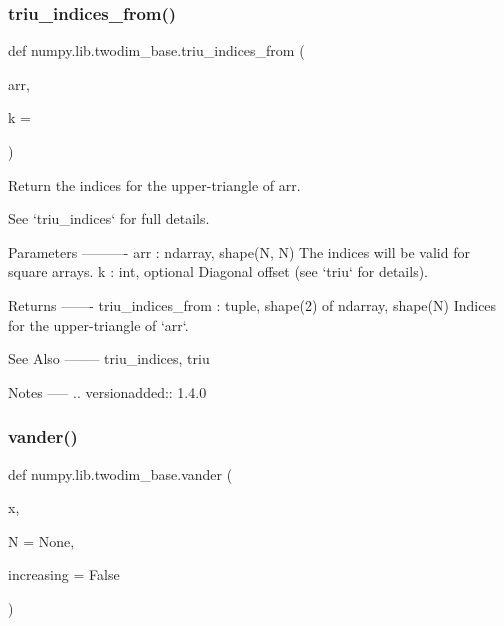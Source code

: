  \mbox{\label{namespacenumpy_1_1lib_1_1twodim__base_aaa286c33b12fe305ea9ead63f3f25f38}} 
\subsubsection{\texorpdfstring{triu\+\_\+indices\+\_\+from()}{triu\_indices\_from()}}
{\footnotesize\ttfamily def numpy.\+lib.\+twodim\+\_\+base.\+triu\+\_\+indices\+\_\+from (\begin{DoxyParamCaption}\item[{}]{arr,  }\item[{}]{k = {} }\end{DoxyParamCaption})}

\begin{DoxyVerb}Return the indices for the upper-triangle of arr.

See `triu_indices` for full details.

Parameters
----------
arr : ndarray, shape(N, N)
    The indices will be valid for square arrays.
k : int, optional
    Diagonal offset (see `triu` for details).

Returns
-------
triu_indices_from : tuple, shape(2) of ndarray, shape(N)
    Indices for the upper-triangle of `arr`.

See Also
--------
triu_indices, triu

Notes
-----
.. versionadded:: 1.4.0\end{DoxyVerb}
 \mbox{\label{namespacenumpy_1_1lib_1_1twodim__base_a2aaf8cbe0cc568d958fd0ec603b94677}} 
\subsubsection{\texorpdfstring{vander()}{vander()}}
{\footnotesize\ttfamily def numpy.\+lib.\+twodim\+\_\+base.\+vander (\begin{DoxyParamCaption}\item[{}]{x,  }\item[{}]{N = {\ttfamily None},  }\item[{}]{increasing = {\ttfamily False} }\end{DoxyParamCaption})}

